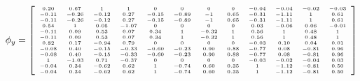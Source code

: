 \documentclass[11pt,a4paper,titlepage]{report}
\begin{document}
\begin{equation}
    \phi_y=
    \left[
    \begin{tiny}
    \begin{array}{*{12}c}
    0.20 & 0.67 & 1 & 1 & 0 & 0 & 0 & 0 & -0.04 & -0.04 & -0.02 & -0.03\\
    -0.11 & -0.26 & -0.12 & 0.27 & -0.15 & -0.89 & -1 & 0.65 & -0.31 & -1.11 & 1 & 0.61\\
    -0.11 & -0.26 & -0.12 & 0.27 & -0.15 & -0.89 & -1 & 0.65 & -0.31 & -1.11 & 1 & 0.61\\
    0.54 & 1 & 0.05 & -1.07 & 0 & 0 & 0 & 0 & 0.03 & -0.06 & 0.06 & -0.01\\
    -0.11 & 0.09 & 0.53 & 0.07 & 0.34 & 1 & -0.32 & 1 & 0.56 & 1 & 0.48 & 1\\
    -0.11 & 0.09 & 0.53 & 0.07 & 0.34 & 1 & -0.32 & 1 & 0.56 & 1 & 0.48 & 1\\
    0.82 & 0.17 & -0.94 & 0.79 & 0 & 0 & 0 & 0 & -0.03 & 0.10 & 0.04 & 0.01\\
    -0.08 & 0.40 & -0.15 & -0.33 & -0.60 & -0.23 & 0.90 & 0.88 & -0.77 & 0.08 & -0.81 & 0.96\\
    -0.08 & 0.40 & -0.15 & -0.33 & -0.60 & -0.23 & 0.90 & 0.88 & -0.77 & 0.08 & -0.81 & 0.96\\
    1 & -1.03 & 0.71 & -0.37 & 0 & 0 & 0 & 0 & -0.03 & -0.02 & -0.04 & 0.03\\
    -0.04 & 0.34 & -0.62 & 0.62 & 1 & -0.74 & 0.60 & 0.35 & 1 & -1.12 & -0.81 & 0.50\\
    -0.04 & 0.34 & -0.62 & 0.62 & 1 & -0.74 & 0.60 & 0.35 & 1 & -1.12 & -0.81 & 0.50\\
    \end{array}
    \end{tiny}
    \right]
    \label{eq:I.1 - phi y}
\end{equation}
\end{document}
